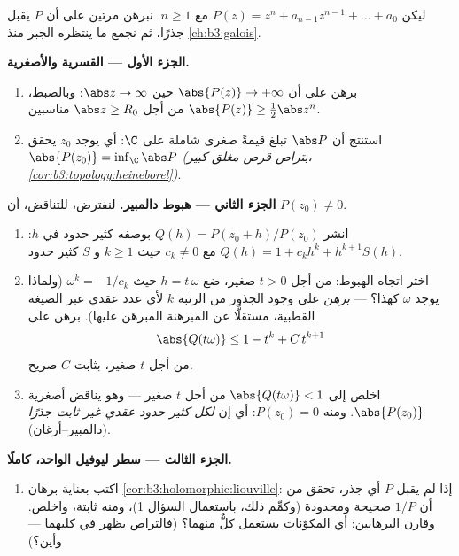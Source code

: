 \begin{problem}\label{pb:b3:holomorphic:1}
ليكن $P(z) = z^n + a_{n-1}z^{n-1} + \dots + a_0$ مع $n \geq 1$. نبرهن مرتين على أن $P$ يقبل جذرًا، ثم
نجمع ما ينتظره الجبر منذ \cref{ch:b3:galois}.

\medskip
\noindent\textbf{الجزء الأول --- القسرية والأصغرية.}
\begin{enumerate}
  \item برهن على أن $\abs{P(z)} \to +\infty$ حين $\abs z \to
        \infty$: وبالضبط، $\abs{P(z)} \geq \frac12\abs z^n$ من
        أجل $\abs z \geq R_0$ مناسبين.
  \item استنتج أن $\abs P$ تبلغ قيمةً صغرى شاملة على $\C$: أي
        يوجد $z_0$ يحقق $\abs{P(z_0)} = \inf_\C\abs P$ \emph{(بتراص قرص مغلق كبير،
        \cref{cor:b3:topology:heineborel})}.
\end{enumerate}

\medskip
\noindent\textbf{الجزء الثاني --- هبوط دالمبير.} لنفترض،
للتناقض، أن $P(z_0) \neq 0$.
\begin{enumerate}[resume]
  \item انشر $Q(h) = P(z_0 + h)/P(z_0)$ بوصفه كثير حدود في $h$: $Q(h) = 1 + c_kh^k + h^{k+1}S(h)$ مع $c_k \neq
        0$
        حيث $k \geq 1$ و $S$ كثير حدود.
  \item اختر اتجاه الهبوط: من أجل $t > 0$ صغير، ضع
        $h = t\,\omega$ حيث $\omega^k = -1/c_k$ (ولماذا يوجد $\omega$ كهذا؟
        --- \emph{برهن} على وجود الجذور من الرتبة $k$ لأي عدد
        عقدي عبر الصيغة القطبية، مستقلًّا عن المبرهنة
        المبرهَن عليها). برهن على
        \[
        \abs{Q(t\omega)} \leq 1 - t^k + C\,t^{k+1}
        \]
        من أجل $t$ صغير، بثابت $C$ صريح.
  \item اخلص إلى $\abs{Q(t\omega)} < 1$ من أجل $t$ صغير --- وهو يناقض أصغرية
        $\abs{P(z_0)}$. ومنه $P(z_0) = 0$: أي إن \emph{لكل
        كثير حدود عقدي غير ثابت جذرًا} (دالمبير--أرغان).
\end{enumerate}

\medskip
\noindent\textbf{الجزء الثالث --- سطر ليوفيل الواحد، كاملًا.}
\begin{enumerate}[resume]
  \item اكتب بعناية برهان \cref{cor:b3:holomorphic:liouville}: إذا لم يقبل $P$ أي
        جذر، تحقق من أن $1/P$ صحيحة ومحدودة (وكمِّم ذلك،
        باستعمال السؤال 1)، ومنه ثابتة، واخلص. وقارن
        البرهانين: أي المكوّنات يستعمل كلٌّ منهما؟ (فالتراص
        يظهر في كليهما --- وأين؟)
\end{enumerate}


\end{problem}
